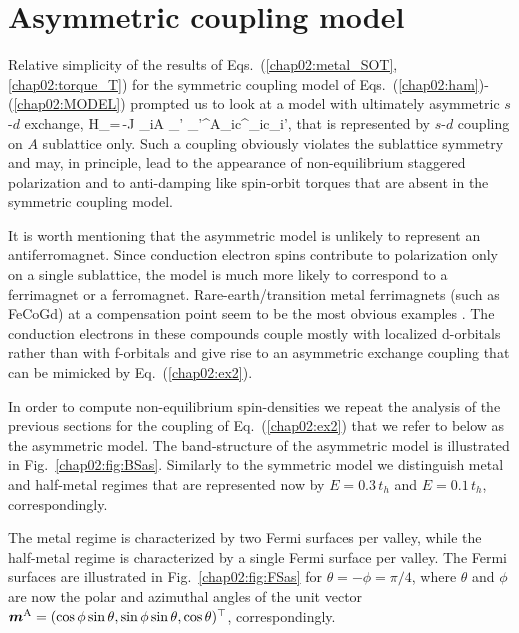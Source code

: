 \section{Asymmetric coupling model} 

Relative simplicity of the results of Eqs.~(\ref{chap02:metal_SOT},\ref{chap02:torque_T}) for the symmetric coupling model of Eqs.~(\ref{chap02:ham})-(\ref{chap02:MODEL}) prompted us to look at a model with ultimately asymmetric $s$-$d$ exchange,
\be
H_=\,-J \s_{i\in A }  \s_{\sigma\sigma'} \bb{\sigma}_{\sigma\sigma'}^\textrm{A}_i\cdot c^\dagger_{i\sigma}c\0_{i\sigma'},
\label{chap02:ex2}
\e
that is represented by $s$-$d$ coupling on $A$ sublattice only. Such a coupling obviously violates the sublattice symmetry and may, in principle, lead to the appearance of non-equilibrium staggered polarization and to anti-damping like spin-orbit torques that are absent in the symmetric coupling model. 

It is worth mentioning that the asymmetric model is unlikely to represent an antiferromagnet. Since conduction electron spins contribute to polarization only on a single sublattice, the model is much more likely to correspond to a ferrimagnet or a ferromagnet.  Rare-earth/transition metal ferrimagnets (such as FeCoGd) at a compensation point seem to be the most obvious examples \cite{jungfleisch_perspectives_2018}. The conduction electrons in these compounds couple mostly with localized d-orbitals rather than with f-orbitals and give rise to an asymmetric exchange coupling that can be mimicked by Eq.~(\ref{chap02:ex2}). 

In order to compute non-equilibrium spin-densities we repeat the analysis of the previous sections for the coupling of Eq.~(\ref{chap02:ex2}) that we refer to below as the asymmetric model. The band-structure of the asymmetric model is illustrated in Fig.~\ref{chap02:fig:BSas}. Similarly to the symmetric model we distinguish metal and half-metal regimes that are represented now by $E=0.3\,t_h$ and $E=0.1\,t_h$, correspondingly. 

The metal regime is characterized by two Fermi surfaces per valley, while the half-metal regime is characterized by a single Fermi surface per valley. The Fermi surfaces are illustrated in Fig.~\ref{chap02:fig:FSas} for $\theta=-\phi=\pi/4$, where $\theta$ and $\phi$ are now the polar and azimuthal angles of the unit vector $\boldsymbol{m}^\textrm{A}=(\cos\phi\sin\theta,\sin\phi\sin\theta,\cos\theta)^\top$, correspondingly. 


